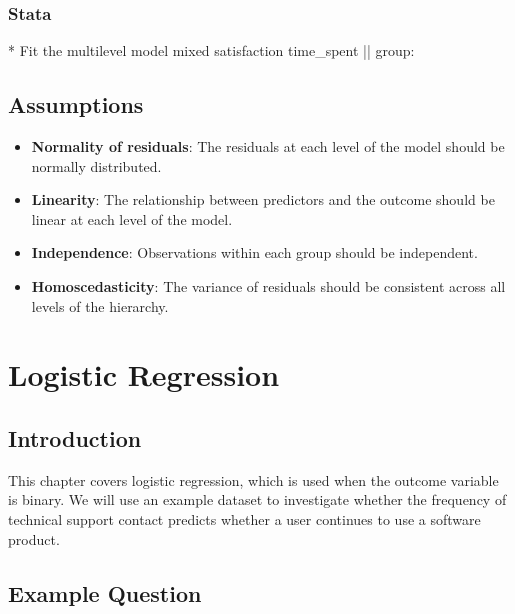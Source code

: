 \documentclass[
  letterpaper,
  DIV=11,
  numbers=noendperiod]{scrreprt}
\newenvironment{Shaded}{\begin{snugshade}}{\end{snugshade}}
\newcommand{\FunctionTok}[1]{\textcolor[rgb]{0.28,0.35,0.67}{#1}}
\newcommand{\KeywordTok}[1]{\textcolor[rgb]{0.00,0.23,0.31}{#1}}
\newcommand{\NormalTok}[1]{\textcolor[rgb]{0.00,0.23,0.31}{#1}}
\providecommand{\tightlist}{%
  \setlength{\itemsep}{0pt}\setlength{\parskip}{0pt}}\usepackage{longtable,booktabs,array}
\begin{document}
\subsection{Stata}\label{stata-2}

\begin{Shaded}
\begin{Highlighting}[]
\NormalTok{* Fit the multilevel }\KeywordTok{model}
\NormalTok{mixed satisfaction time\_spent || }\FunctionTok{group}\NormalTok{:}
\end{Highlighting}
\end{Shaded}

\section{Assumptions}\label{assumptions-2}

\begin{itemize}
\tightlist
\item
  \textbf{Normality of residuals}: The residuals at each level of the
  model should be normally distributed.
\item
  \textbf{Linearity}: The relationship between predictors and the
  outcome should be linear at each level of the model.
\item
  \textbf{Independence}: Observations within each group should be
  independent.
\item
  \textbf{Homoscedasticity}: The variance of residuals should be
  consistent across all levels of the hierarchy.
\end{itemize}


\chapter{Logistic Regression}\label{logistic-regression}

\section{Introduction}\label{introduction-4}

This chapter covers logistic regression, which is used when the outcome
variable is binary. We will use an example dataset to investigate
whether the frequency of technical support contact predicts whether a
user continues to use a software product.

\section{Example Question}\label{example-question-3}
\end{document}
